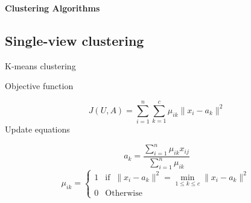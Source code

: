 \documentclass[compress,sky blue]{beamer}
\begin{document}

\begin{frame}{}
    \centering
    \Huge{\textbf{Clustering Algorithms}}
\end{frame}

\subsection{Single-view clustering}

\begin{frame}{K-means clustering}
	\vspace{-0.3cm}	

    
Objective function 

	\begin{equation}
            J(U, A)  = \sum_{i=1}^{n}\sum_{k=1} ^{c}\mu_{ik}\|x_{i}-a_{k}\|^2
            \label{updateU} %
        \end{equation}
Update equations

	\begin{equation}
            a_{k}  = \frac{\sum_{i=1}^{n}\mu_{ik} x_{ij}} {\sum_{i=1}^{n}\mu_{ik}}
            \label{updateA} %
        \end{equation} \begin{equation}\label{knuth1} \mu_{ik}=
\begin{cases}
1      &\text{if }\  \|x_{i}-a_{k}\|^2 = \min\limits_{1\leq k\leq c}\|x_{i}-a_{k}\|^2\\
0      & \text{Otherwise}
\end{cases}
\end{equation}
        

\end{frame}

\end{document}
